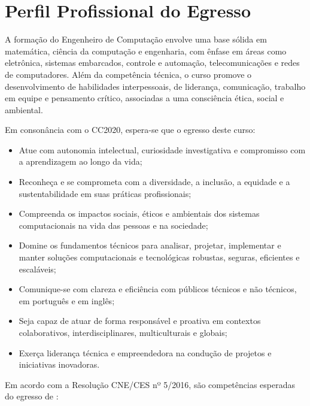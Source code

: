 \chapter{Perfil Profissional do Egresso}

A formação do Engenheiro de Computação envolve uma base sólida em matemática, ciência da computação e engenharia, com ênfase em áreas como eletrônica, sistemas embarcados, controle e automação, telecomunicações e redes de computadores. Além da competência técnica, o curso promove o desenvolvimento de habilidades interpessoais, de liderança, comunicação, trabalho em equipe e pensamento crítico, associadas a uma consciência ética, social e ambiental.

Em consonância com o CC2020, espera-se que o egresso deste curso:

\begin{itemize}
    \item Atue com autonomia intelectual, curiosidade investigativa e compromisso com a aprendizagem ao longo da vida;
    \item Reconheça e se comprometa com a diversidade, a inclusão, a equidade e a sustentabilidade em suas práticas profissionais;
    \item Compreenda os impactos sociais, éticos e ambientais dos sistemas computacionais na vida das pessoas e na sociedade;
    \item Domine os fundamentos técnicos para analisar, projetar, implementar e manter soluções computacionais e tecnológicas robustas, seguras, eficientes e escaláveis;
    \item Comunique-se com clareza e eficiência com públicos técnicos e não técnicos, em português e em inglês;
    \item Seja capaz de atuar de forma responsável e proativa em contextos colaborativos, interdisciplinares, multiculturais e globais;
    \item Exerça liderança técnica e empreendedora na condução de projetos e iniciativas inovadoras.
\end{itemize}

Em acordo com a Resolução CNE/CES nº 5/2016, são competências esperadas do egresso de \nomecursonovo:

